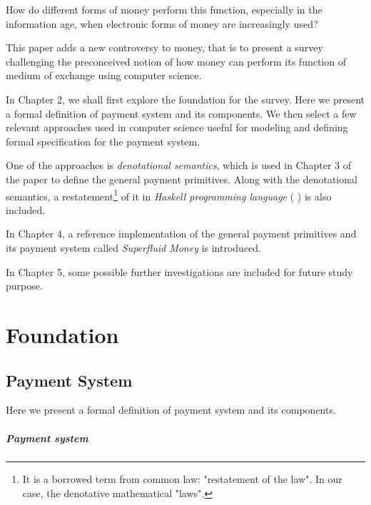 \documentclass[a4paper,10pt]{report}
\begin{document}
How do different forms of money perform this function, especially in the information age, when electronic forms of money
are increasingly used?

This paper adds a new controversy to money, that is to present a survey challenging the preconceived notion of how money
can perform its function of medium of exchange using computer science.

In Chapter 2, we shall first explore the foundation for the survey. Here we present a formal definition of payment
system and its components. We then select a few relevant approaches used in computer science useful for modeling and
defining formal specification for the payment system.

One of the approaches is \textit{denotational semantics}, which is used in Chapter 3 of the paper to define the general
payment primitives. Along with the denotational semantics, a restatement\footnote{It is a borrowed term from common law:
"restatement of the law". In our case, the denotative mathematical "laws".} of it in \textit{Haskell programming
    language} (\cite{hudak1992report} \cite{jones2003haskell} \cite{marlow2010haskell}) is also included.

In Chapter 4, a reference implementation of the general payment primitives and its payment system called
\textit{Superfluid Money} is introduced.

In Chapter 5, some possible further investigations are included for future study purpose.

\chapter{Foundation}

\section{Payment System}

Here we present a formal definition of payment system and its components.

\paragraph{Payment system}
\end{document}
